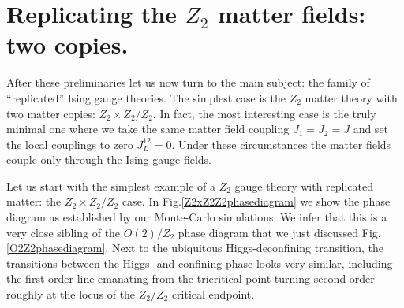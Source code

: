 \section{Replicating the $Z_2$ matter fields: two copies.}
\label{replZ2}

After these preliminaries let us now turn to the main subject: the family of ``replicated'' Ising gauge theories. The simplest case is the $Z_2$ matter theory with two matter copies:  $Z_2 \times Z_2 / Z_2$. In fact, the most interesting  case is the truly minimal one where we take the same matter field coupling $J_1 = J_2 = J$ and set the local couplings to zero $J^{12}_L = 0$. Under these circumstances the matter fields couple only through the Ising gauge fields.  

Let us start with the simplest example of a $Z_2$ gauge theory with replicated matter: the $Z_2 \times Z_2 / Z_2$ case. In Fig.\ref{Z2xZ2Z2phasediagram} we show the phase diagram as established by our Monte-Carlo simulations.  We infer that this is a very close sibling of the $O(2)/Z_2$ phase diagram that we just discussed Fig.\ref{O2Z2phasediagram}. Next to the ubiquitous Higgs-deconfining transition, the transitions between the Higgs- and confining phase looks very similar, including the first order line emanating from the tricritical point turning second order roughly at the locus of the $Z_2/Z_2$ critical endpoint. 


